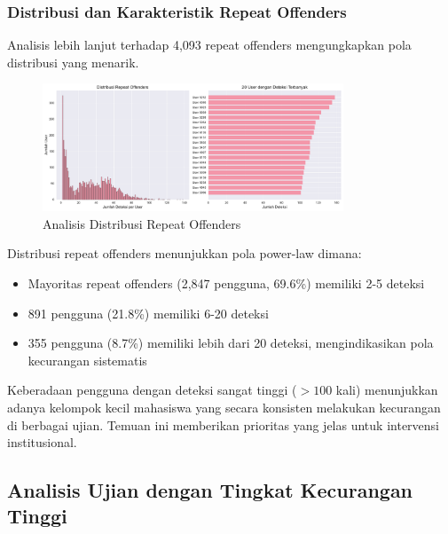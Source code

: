 \subsubsection{Distribusi dan Karakteristik Repeat Offenders}

Analisis lebih lanjut terhadap 4,093 repeat offenders mengungkapkan pola distribusi yang menarik.

\begin{figure}[htbp]
    \centering
    \includegraphics[width=0.8\textwidth]{figures/repeat_offender_analysis.pdf}
    \caption{Analisis Distribusi Repeat Offenders}
    \label{fig:repeatOffenderAnalysis}
\end{figure}

Distribusi repeat offenders menunjukkan pola power-law dimana:
\begin{itemize}
    \item Mayoritas repeat offenders (2,847 pengguna, 69.6\%) memiliki 2-5 deteksi
    \item 891 pengguna (21.8\%) memiliki 6-20 deteksi
    \item 355 pengguna (8.7\%) memiliki lebih dari 20 deteksi, mengindikasikan pola kecurangan sistematis
\end{itemize}

Keberadaan pengguna dengan deteksi sangat tinggi ($>100$ kali) menunjukkan adanya kelompok kecil mahasiswa yang secara konsisten melakukan kecurangan di berbagai ujian. Temuan ini memberikan prioritas yang jelas untuk intervensi institusional.

\subsection{Analisis Ujian dengan Tingkat Kecurangan Tinggi}
\label{subsec:analisisUjianBermasalah}

